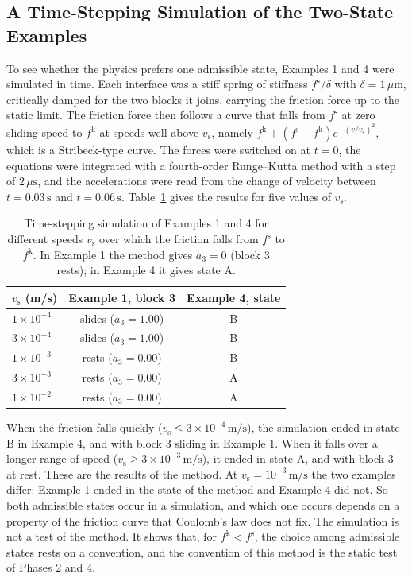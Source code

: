 \documentclass[11pt,a4paper]{article}
\newcommand{\fs}{f^{\mathrm{s}}}
\newcommand{\fkin}{f^{\mathrm{k}}}
\begin{document}
\subsection{A Time-Stepping Simulation of the Two-State Examples}\label{sec:simulation}

To see whether the physics prefers one admissible state, Examples 1 and 4 were simulated in time. Each interface was a stiff spring of stiffness $\fs/\delta$ with $\delta=1\,\mu\mathrm{m}$, critically damped for the two blocks it joins, carrying the friction force up to the static limit. The friction force then follows a curve that falls from $\fs$ at zero sliding speed to $\fkin$ at speeds well above $v_{\mathrm s}$, namely $\fkin+(\fs-\fkin)e^{-(v/v_{\mathrm s})^{2}}$, which is a Stribeck-type curve. The forces were switched on at $t=0$, the equations were integrated with a fourth-order Runge--Kutta method with a step of $2\,\mu\mathrm{s}$, and the accelerations were read from the change of velocity between $t=0.03\,\mathrm{s}$ and $t=0.06\,\mathrm{s}$. Table~\ref{tab:sim} gives the results for five values of $v_{\mathrm s}$.

\begin{table}[ht]
\centering\small
\caption{Time-stepping simulation of Examples 1 and 4 for different speeds $v_{\mathrm s}$ over which the friction falls from $f^{\mathrm s}$ to $f^{\mathrm k}$. In Example 1 the method gives $a_3=0$ (block 3 rests); in Example 4 it gives state A.}\label{tab:sim}
\begin{tabular}{@{}lcc@{}}
\toprule
$v_{\mathrm s}$ (m/s) & Example 1, block 3 & Example 4, state\\
\midrule
$1\times10^{-4}$ & slides ($a_3=1.00$) & B \\
$3\times10^{-4}$ & slides ($a_3=1.00$) & B \\
$1\times10^{-3}$ & rests ($a_3=0.00$) & B \\
$3\times10^{-3}$ & rests ($a_3=0.00$) & A \\
$1\times10^{-2}$ & rests ($a_3=0.00$) & A \\
\bottomrule
\end{tabular}
\end{table}


When the friction falls quickly ($v_{\mathrm s}\le3\times10^{-4}\,\mathrm{m/s}$), the simulation ended in state B in Example 4, and with block 3 sliding in Example 1. When it falls over a longer range of speed ($v_{\mathrm s}\ge3\times10^{-3}\,\mathrm{m/s}$), it ended in state A, and with block 3 at rest. These are the results of the method. At $v_{\mathrm s}=10^{-3}\,\mathrm{m/s}$ the two examples differ: Example 1 ended in the state of the method and Example 4 did not. So both admissible states occur in a simulation, and which one occurs depends on a property of the friction curve that Coulomb's law does not fix. The simulation is not a test of the method. It shows that, for $\fkin<\fs$, the choice among admissible states rests on a convention, and the convention of this method is the static test of Phases 2 and 4.
\end{document}
